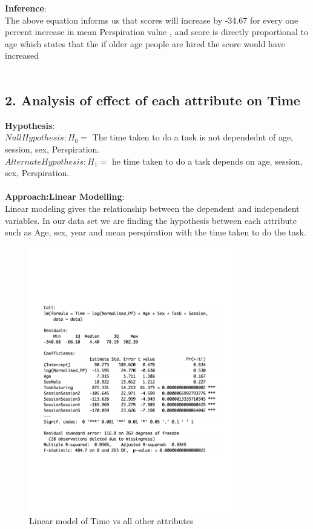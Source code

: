 \documentclass[12pt,epsf]{report}
\begin{document}
\textbf{Inference}:\\
The above equation informs us that scores will increase by -34.67 for every one percent increase in mean Perspiration value , and score is directly proportional to age which states that the if older age people are hired the score would have increased\\
\\
\FloatBarrier
\subsection*{2. Analysis of effect of each attribute on Time}
\textbf{Hypothesis}:\\
$Null Hypothesis : H_0 = $ The time taken to do a task is not dependednt of age, session, sex, Perspiration.\\
$Alternate Hypothesis : H_1 = $ he time taken to do a task depends on  age, session, sex, Perspiration.\\
\\
\textbf{Approach:Linear Modelling}:\\
Linear modeling gives the relationship between the dependent and independent variables. 
In our data set we are finding the hypothesis between each attribute such as Age, sex, year and mean perspiration with the time taken to do the task.\\
\begin{figure}[!htb]
	\centering
	\includegraphics[width=0.8\textwidth]{TimeSummary.pdf}
	\caption{Linear model of Time vs all other attributes}
	\centering
\end{figure}
\end{document}
